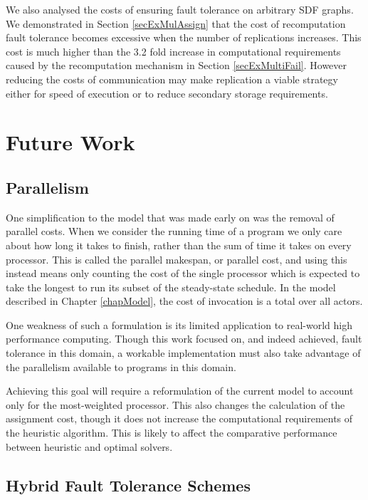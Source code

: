 We also analysed the costs of ensuring fault tolerance on arbitrary SDF graphs.
We demonstrated in Section \ref{secExMulAssign} that the cost of recomputation fault tolerance becomes excessive when the number of replications increases.
This cost is much higher than the 3.2 fold increase in computational requirements caused by the recomputation mechanism in Section \ref{secExMultiFail}.
However reducing the costs of communication may make replication a viable strategy either for speed of execution or to reduce secondary storage requirements.

\section{Future Work}
\label{secConFut}

\subsection{Parallelism}

One simplification to the model that was made early on was the removal of parallel costs.
When we consider the running time of a program we only care about how long it takes to finish, rather than the sum of time it takes on every processor.
This is called the parallel makespan, or parallel cost, and using this instead means only counting the cost of the single processor which is expected to take the longest to run its subset of the steady-state schedule.
In the model described in Chapter \ref{chapModel}, the cost of invocation is a total over all actors.

One weakness of such a formulation is its limited application to real-world high performance computing.
Though this work focused on, and indeed achieved, fault tolerance in this domain, a workable implementation must also take advantage of the parallelism available to programs in this domain.

Achieving this goal will require a reformulation of the current model to account only for the most-weighted processor.
This also changes the calculation of the assignment cost, though it does not increase the computational requirements of the heuristic algorithm.
This is likely to affect the comparative performance between heuristic and optimal solvers.

\subsection{Hybrid Fault Tolerance Schemes}

